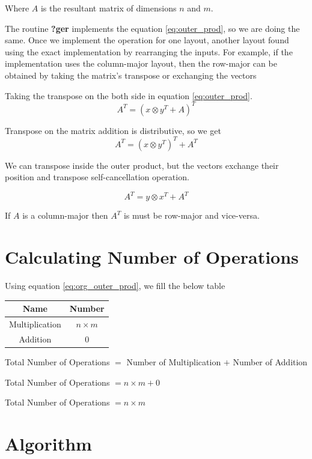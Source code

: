 Where $A$ is the resultant matrix of dimensions $n$ and $m$.

The routine \textbf{?ger} implements the equation \ref{eq:outer_prod}, 
so we are doing the same. Once we implement the operation for one layout, 
another layout found using the exact implementation by rearranging 
the inputs. For example, if the implementation uses the column-major 
layout, then the row-major can be obtained by taking the matrix's 
transpose or exchanging the vectors

Taking the transpose on the both side in equation \ref{eq:outer_prod}.
\[A^T = (x \otimes y^T + A)^T\]

Transpose on the matrix addition is distributive, so we get
\[A^T = (x \otimes y^T)^T + A^T\]

We can transpose inside the outer product, but the vectors exchange 
their position and transpose self-cancellation operation.

\begin{equation}
    A^T = y \otimes x^T + A^T
    \label{eq:outer_prod_trans}
\end{equation}

If $A$ is a column-major then $A^T$ is must be row-major and vice-versa.

\clearpage
\section{Calculating Number of Operations}

Using equation \ref{eq:org_outer_prod}, we fill the below table

\begin{table}[ht]
    \centering
    \begin{tabular}{|c|c|}
        \hline
        \textbf{Name} & \textbf{Number} \\
        \hline
        Multiplication & $n \times m$ \\
        \hline
        Addition & $0$ \\
        \hline
    \end{tabular}
\end{table}

Total Number of Operations $=$ Number of Multiplication $+$ Number of Addition

Total Number of Operations $= n \times m + 0$

Total Number of Operations $= n \times m$

\section{Algorithm}

